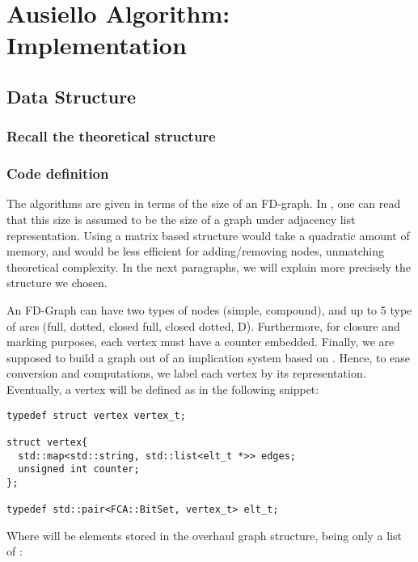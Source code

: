\section{Ausiello Algorithm: Implementation}

\subsection{Data Structure}

\subsubsection{Recall the theoretical structure}

\subsubsection{Code definition}

The algorithms are given in terms of the size of an FD-graph. In 
\cite{ausiello_minimal_1986}, one can read that this size is assumed to be the
size of a graph under adjacency list representation. Using a matrix based 
structure would take a quadratic amount of memory, and would be less efficient
for adding/removing nodes, unmatching theoretical complexity. In the next
paragraphs, we will explain more precisely the structure we chosen.

\vspace{1.2em}

An FD-Graph can have two types of nodes (simple, compound), and up to 5 type
of arcs (full, dotted, closed full, closed dotted, D). Furthermore, for closure
and marking purposes, each vertex must have a counter embedded. Finally, we
are supposed to build a graph out of an implication system based on 
. Hence, to ease conversion and computations, we label each vertex
by its  representation. Eventually, a vertex will be defined as in 
the following snippet:

\begin{lstlisting}[language=CoreCpp, style=Light, breaklines=true]
typedef struct vertex vertex_t;

struct vertex{
  std::map<std::string, std::list<elt_t *>> edges;
  unsigned int counter;
};

typedef std::pair<FCA::BitSet, vertex_t> elt_t;

\end{lstlisting}

\noindent Where  will be elements stored in the overhaul graph 
structure, being only a list of :

